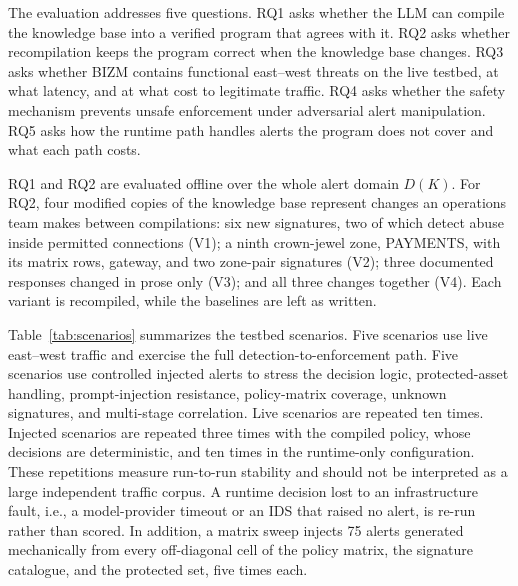 \documentclass[final,5p]{elsarticle}
\begin{document}
The evaluation addresses five questions. RQ1 asks whether the LLM can compile the knowledge base into a verified program that agrees with it. RQ2 asks whether recompilation keeps the program correct when the knowledge base changes. RQ3 asks whether BIZM contains functional east--west threats on the live testbed, at what latency, and at what cost to legitimate traffic. RQ4 asks whether the safety mechanism prevents unsafe enforcement under adversarial alert manipulation. RQ5 asks how the runtime path handles alerts the program does not cover and what each path costs.

RQ1 and RQ2 are evaluated offline over the whole alert domain $D(K)$. For RQ2, four modified copies of the knowledge base represent changes an operations team makes between compilations: six new signatures, two of which detect abuse inside permitted connections (V1); a ninth crown-jewel zone, PAYMENTS, with its matrix rows, gateway, and two zone-pair signatures (V2); three documented responses changed in prose only (V3); and all three changes together (V4). Each variant is recompiled, while the baselines are left as written.

Table~\ref{tab:scenarios} summarizes the testbed scenarios. Five scenarios use live east--west traffic and exercise the full detection-to-enforcement path. Five scenarios use controlled injected alerts to stress the decision logic, protected-asset handling, prompt-injection resistance, policy-matrix coverage, unknown signatures, and multi-stage correlation. Live scenarios are repeated ten times. Injected scenarios are repeated three times with the compiled policy, whose decisions are deterministic, and ten times in the runtime-only configuration. These repetitions measure run-to-run stability and should not be interpreted as a large independent traffic corpus. A runtime decision lost to an infrastructure fault, i.e., a model-provider timeout or an IDS that raised no alert, is re-run rather than scored. In addition, a matrix sweep injects 75 alerts generated mechanically from every off-diagonal cell of the policy matrix, the signature catalogue, and the protected set, five times each.
\end{document}
